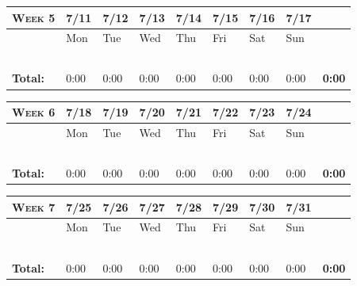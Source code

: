 \documentclass{article}
\begin{document}
\vspace{0.2in}

\begin{tabular}{ |m{1cm}||m{1cm}|m{1cm}|m{1cm}|m{1cm}|m{1cm}|m{1cm}|m{1cm}||m{1cm}|} 
\hline
\textsc{Week 5} & 7/11 & 7/12 & 7/13 & 7/14 & 7/15 & 7/16 & 7/17 & \\ 
\hline
\rowcolor{lightgray} 
\cellcolor{white} & Mon & Tue & Wed & Thu & Fri & Sat & Sun & \cellcolor{white}\\ 
\hline
\hline
 & & & & & & & & \\ 
\hline
 & & & & & & & & \\ 
\hline
 & & & & & & & & \\ 
\hline
 & & & & & & & & \\ 
\hline
 & & & & & & & & \\ 
\hline
\textbf{Total:} & 0:00 & 0:00 & 0:00 & 0:00 & 0:00 & 0:00 & 0:00 & \textbf{0:00} \\
\hline
\end{tabular}

\vspace{0.2in}

\begin{tabular}{ |m{1cm}||m{1cm}|m{1cm}|m{1cm}|m{1cm}|m{1cm}|m{1cm}|m{1cm}||m{1cm}|} 
\hline
\textsc{Week 6} & 7/18 & 7/19 & 7/20 & 7/21 & 7/22 & 7/23 & 7/24 & \\ 
\hline
\rowcolor{lightgray} 
\cellcolor{white} & Mon & Tue & Wed & Thu & Fri & Sat & Sun & \cellcolor{white}\\ 
\hline
\hline
 & & & & & & & & \\ 
\hline
 & & & & & & & & \\ 
\hline
 & & & & & & & & \\ 
\hline
 & & & & & & & & \\ 
\hline
 & & & & & & & & \\ 
\hline
\textbf{Total:} & 0:00 & 0:00 & 0:00 & 0:00 & 0:00 & 0:00 & 0:00 & \textbf{0:00} \\
\hline
\end{tabular}

\vspace{0.2in}

\begin{tabular}{ |m{1cm}||m{1cm}|m{1cm}|m{1cm}|m{1cm}|m{1cm}|m{1cm}|m{1cm}||m{1cm}|} 
\hline
\textsc{Week 7} & 7/25 & 7/26 & 7/27 & 7/28 & 7/29 & 7/30 & 7/31 & \\ 
\hline
\rowcolor{lightgray} 
\cellcolor{white} & Mon & Tue & Wed & Thu & Fri & Sat & Sun & \cellcolor{white}\\ 
\hline
\hline
 & & & & & & & & \\ 
\hline
 & & & & & & & & \\ 
\hline
 & & & & & & & & \\ 
\hline
 & & & & & & & & \\ 
\hline
 & & & & & & & & \\ 
\hline
\textbf{Total:} & 0:00 & 0:00 & 0:00 & 0:00 & 0:00 & 0:00 & 0:00 & \textbf{0:00} \\
\hline
\end{tabular}
\end{document}
